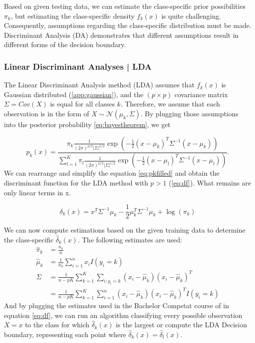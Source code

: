 \documentclass[12pt,a4paper,titlepage]{article}
\numberwithin{equation}{section}
\numberwithin{table}{section}
\numberwithin{figure}{section}
\begin{document}
    \noindent Based on given testing data, we can estimate the class-specific prior possibilities $\pi_k$, but estimating the class-specific density $f_k(x)$ is quite challenging. Consequently, assumptions regarding the class-specific distribution must be made. Discriminant Analysis (DA) demonstrates that different assumptions result in different forms of the decision boundary.
    
        \subsubsection{Linear Discriminant Analyses | LDA}\label{LDA}
        The Linear Discriminant Analysis method (LDA) assumes that $f_k(x)$ is Gaussian distributed (\ref{app:gaussian}), and the $(p\times p)$ covariance matrix $\Sigma = Cov(X)$ is equal for all classes $k$. Therefore, we assume that each observation is in the form of $X \sim \mathcal{N}(\mu_k, \Sigma)$.
        By plugging those assumptions into the posterior probability \ref{eq:bayestheorem}, we get
        
        \begin{equation}
        \label{eq:pkfilled}
        p_k(x) =\frac{\pi_k \frac{1}{(2\pi)^{p/2}|\Sigma|^{1/2}}\exp\left(-\frac{1}{2}(x-\mu_k)^T\Sigma^{-1}(x-\mu_k)\right)}{\sum_{l=1}^K\pi_l\frac{1}{(2\pi)^{p/2}|\Sigma|^{1/2}}\exp\left(-\frac{1}{2}(x-\mu_l)^T\Sigma^{-1}(x-\mu_l)\right)}.
        \end{equation}
    We can rearrange and simplify the equation \ref{eq:pkfilled} and obtain the discriminant function for the LDA method with $p>1$ (\ref{eq:df}). What remains are only linear terms in x.
        
        \begin{equation}
        \label{eq:df}
        \delta_k(x)=x^T \Sigma^{-1}\mu_k - \frac{1}{2}\mu_k^T \Sigma^{-1}\mu_k + \log(\pi_k)
        \end{equation}

        \noindent We can now compute estimations based on the given training data to determine the class-specific $\hat\delta_k(x)$. The following estimates are used:
        \begin{align}
        \label{eq:estimateslda}
        \hat\pi_k    & = \frac{n_k}{n}\\
        \hat\mu_k
        & = \frac{1}{n_k}\sum_{i=1}^n x_iI(y_i=k)\\
        \hat{\Sigma}
        & = \frac{1}{n-pK}\sum_{k=1}^K\sum_{i:y_i=k}(x_i-\hat\mu_k)(x_i-\hat\mu_k)^T \nonumber\\
        & = \frac{1}{n-pK}\sum_{k=1}^K\sum_{i=1}^n  (x_i-\hat\mu_k)(x_i-\hat\mu_k)^T I(y_i=k)
        \end{align}
        And by plugging the estimates used in the Bachelor Compstat course of \cite{compstat} in equation \ref{eq:df}, we can run an algorithm classifying every possible observation $X=x$ to the class for which $\hat\delta_k(x)$ is the largest or compute the LDA Decision boundary, representing each point where $\hat\delta_k(x) = \hat\delta_l(x)$.
        
\end{document}
